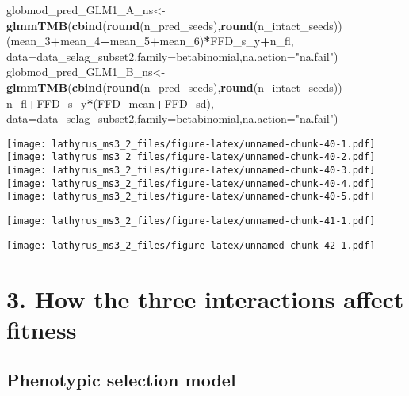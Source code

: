 \documentclass[
]{article}
\newenvironment{Shaded}{\begin{snugshade}}{\end{snugshade}}
\newcommand{\DataTypeTok}[1]{\textcolor[rgb]{0.13,0.29,0.53}{#1}}
\newcommand{\DecValTok}[1]{\textcolor[rgb]{0.00,0.00,0.81}{#1}}
\newcommand{\KeywordTok}[1]{\textcolor[rgb]{0.13,0.29,0.53}{\textbf{#1}}}
\newcommand{\NormalTok}[1]{#1}
\newcommand{\OperatorTok}[1]{\textcolor[rgb]{0.81,0.36,0.00}{\textbf{#1}}}
\newcommand{\StringTok}[1]{\textcolor[rgb]{0.31,0.60,0.02}{#1}}
\begin{document}
\begin{Shaded}
\begin{Highlighting}[]
\NormalTok{globmod_pred_GLM1_A_ns<-}\KeywordTok{glmmTMB}\NormalTok{(}\KeywordTok{cbind}\NormalTok{(}\KeywordTok{round}\NormalTok{(n_pred_seeds),}\KeywordTok{round}\NormalTok{(n_intact_seeds))}\OperatorTok{~}
\StringTok{                             }\NormalTok{(mean_}\DecValTok{3}\OperatorTok{+}\NormalTok{mean_}\DecValTok{4}\OperatorTok{+}\NormalTok{mean_}\DecValTok{5}\OperatorTok{+}\NormalTok{mean_}\DecValTok{6}\NormalTok{)}\OperatorTok{*}\NormalTok{FFD_s_y}\OperatorTok{+}\NormalTok{n_fl,}
                           \DataTypeTok{data=}\NormalTok{data_selag_subset2,}\DataTypeTok{family=}\NormalTok{betabinomial,}\DataTypeTok{na.action=}\StringTok{"na.fail"}\NormalTok{)}
\NormalTok{globmod_pred_GLM1_B_ns<-}\KeywordTok{glmmTMB}\NormalTok{(}\KeywordTok{cbind}\NormalTok{(}\KeywordTok{round}\NormalTok{(n_pred_seeds),}\KeywordTok{round}\NormalTok{(n_intact_seeds))}\OperatorTok{~}
\StringTok{                             }\NormalTok{n_fl}\OperatorTok{+}\NormalTok{FFD_s_y}\OperatorTok{*}\NormalTok{(FFD_mean}\OperatorTok{+}\NormalTok{FFD_sd),}
                           \DataTypeTok{data=}\NormalTok{data_selag_subset2,}\DataTypeTok{family=}\NormalTok{betabinomial,}\DataTypeTok{na.action=}\StringTok{"na.fail"}\NormalTok{)}
\end{Highlighting}
\end{Shaded}

\texttt{[image: lathyrus\_ms3\_2\_files/figure-latex/unnamed-chunk-40-1.pdf]}
\texttt{[image: lathyrus\_ms3\_2\_files/figure-latex/unnamed-chunk-40-2.pdf]}
\texttt{[image: lathyrus\_ms3\_2\_files/figure-latex/unnamed-chunk-40-3.pdf]}
\texttt{[image: lathyrus\_ms3\_2\_files/figure-latex/unnamed-chunk-40-4.pdf]}
\texttt{[image: lathyrus\_ms3\_2\_files/figure-latex/unnamed-chunk-40-5.pdf]}

\texttt{[image: lathyrus\_ms3\_2\_files/figure-latex/unnamed-chunk-41-1.pdf]}

\texttt{[image: lathyrus\_ms3\_2\_files/figure-latex/unnamed-chunk-42-1.pdf]}

\hypertarget{how-the-three-interactions-affect-fitness}{%
\section{3. How the three interactions affect
fitness}\label{how-the-three-interactions-affect-fitness}}

\hypertarget{phenotypic-selection-model}{%
\subsection{Phenotypic selection
model}\label{phenotypic-selection-model}}
\end{document}
